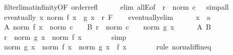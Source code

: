 \begin{isabellebody}
\ filterlim{\isacharunderscore}{\kern0pt}at{\isacharunderscore}{\kern0pt}infinity{\isacharbrackleft}{\kern0pt}OF\ order{\isacharunderscore}{\kern0pt}refl{\isacharbrackright}{\kern0pt}\isanewline
\ \ \ \ \isamarkupfalse%
\ {\isacharparenleft}{\kern0pt}elim\ allE{\isacharbrackleft}{\kern0pt}of\ {\isacharunderscore}{\kern0pt}\ {\isachardoublequoteopen}r\ {\isacharplus}{\kern0pt}\ norm\ c\ {\isacharplus}{\kern0pt}\ {}{\isachardoublequoteclose}{\isacharbrackright}{\kern0pt}{\isacharparenright}{\kern0pt}\ simp{\isacharunderscore}{\kern0pt}all\isanewline
\ \ \isamarkupfalse%
\ \isamarkupfalse%
\ {\isachardoublequoteopen}eventually\ {\isacharparenleft}{\kern0pt}{\isasymlambda}x{\isachardot}{\kern0pt}\ norm\ {\isacharparenleft}{\kern0pt}f\ x\ {\isacharplus}{\kern0pt}\ g\ x{\isacharparenright}{\kern0pt}\ {\isasymge}\ r{\isacharparenright}{\kern0pt}\ F{\isachardoublequoteclose}\isanewline
\ \ \isamarkupfalse%
\ eventually{\isacharunderscore}{\kern0pt}elim\isanewline
\ \ \ \ \isamarkupfalse%
\ x\ {\isacharcolon}{\kern0pt}{\isacharcolon}{\kern0pt}\ {\isacharprime}{\kern0pt}a\isanewline
\ \ \ \ \isamarkupfalse%
\ A{\isacharcolon}{\kern0pt}\ {\isachardoublequoteopen}norm\ {\isacharparenleft}{\kern0pt}f\ x{\isacharparenright}{\kern0pt}\ {\isacharless}{\kern0pt}\ norm\ c\ {\isacharplus}{\kern0pt}\ {}{\isachardoublequoteclose}\ \ B{\isacharcolon}{\kern0pt}\ {\isachardoublequoteopen}r\ {\isacharplus}{\kern0pt}\ norm\ c\ {\isacharplus}{\kern0pt}\ {}\ {\isasymle}\ norm\ {\isacharparenleft}{\kern0pt}g\ x{\isacharparenright}{\kern0pt}{\isachardoublequoteclose}\isanewline
\ \ \ \ \isamarkupfalse%
\ A\ B\ \isamarkupfalse%
\ {\isachardoublequoteopen}r\ {\isasymle}\ norm\ {\isacharparenleft}{\kern0pt}g\ x{\isacharparenright}{\kern0pt}\ {\isacharminus}{\kern0pt}\ norm\ {\isacharparenleft}{\kern0pt}f\ x{\isacharparenright}{\kern0pt}{\isachardoublequoteclose}\isanewline
\ \ \ \ \ \ \isamarkupfalse%
\ simp\isanewline
\ \ \ \ \isamarkupfalse%
\ \isamarkupfalse%
\ {\isachardoublequoteopen}norm\ {\isacharparenleft}{\kern0pt}g\ x{\isacharparenright}{\kern0pt}\ {\isacharminus}{\kern0pt}\ norm\ {\isacharparenleft}{\kern0pt}f\ x{\isacharparenright}{\kern0pt}\ {\isasymle}\ norm\ {\isacharparenleft}{\kern0pt}g\ x\ {\isacharplus}{\kern0pt}\ f\ x{\isacharparenright}{\kern0pt}{\isachardoublequoteclose}\isanewline
\ \ \ \ \ \ \isamarkupfalse%
\ {\isacharparenleft}{\kern0pt}rule\ norm{\isacharunderscore}{\kern0pt}diff{\isacharunderscore}{\kern0pt}ineq{\isacharparenright}{\kern0pt}\isanewline

\end{isabellebody}
